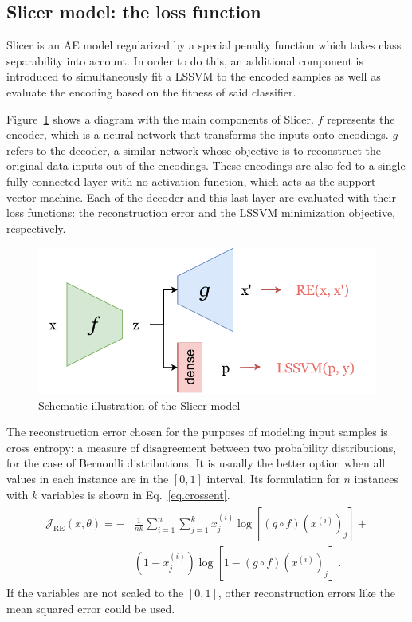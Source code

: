 \documentclass[
	fontsize=11pt, %
	twoside=false, %
	open=any, %
	secnumdepth=1, %
]{kaobook}
\begin{document}
\subsection{Slicer model: the loss function}

Slicer is an AE model regularized by a special penalty function which takes class separability into account. In order to do this, an additional component is introduced to simultaneously fit a LSSVM to the encoded samples as well as evaluate the encoding based on the fitness of said classifier.

Figure~\ref{fig:slicerdiag} shows a diagram with the main components of Slicer. $f$ represents the encoder, which is a neural network that transforms the inputs onto encodings. $g$ refers to the decoder, a similar network whose objective is to reconstruct the original data inputs out of the encodings. These encodings are also fed to a single fully connected layer with no activation function, which acts as the support vector machine. Each of the decoder and this last layer are evaluated with their loss functions: the reconstruction error and the LSSVM minimization objective, respectively.

\begin{figure}
    \centering
    \includegraphics[width=0.6\linewidth]{slicer.pdf}
    \caption{Schematic illustration of the Slicer model}
    \label{fig:slicerdiag}
\end{figure}

The reconstruction error chosen for the purposes of modeling input samples is cross entropy: a measure of disagreement between two probability distributions, for the case of Bernoulli distributions. It is usually the better option when all values in each instance are in the $[0,1]$ interval.  Its formulation for $n$ instances with $k$ variables is shown in Eq.~\ref{eq.crossent}.
\begin{align}
\begin{split}\label{eq.crossent}
    \mathcal J_{\mbox{RE}}(x,\theta)=-&\frac{1}{nk}\sum_{i=1}^n\sum_{j=1}^k x^{(i)}_j \log\left[ (g\circ f)\left(x^{(i)}\right)_j\right] +\\& \left(1-x^{(i)}_j\right)\log\left[1-(g\circ f)\left(x^{(i)}\right)_j\right]~.
\end{split}
\end{align}
If the variables are not scaled to the $[0,1]$, other reconstruction errors like the mean squared error could be used.
\end{document}

